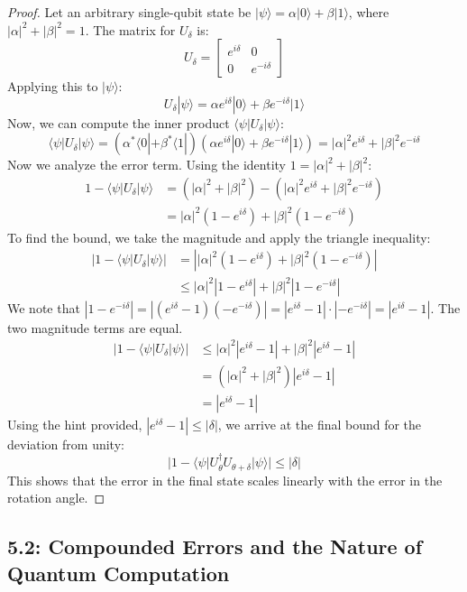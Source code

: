 \documentclass{article}
\newcommand{\ket}[1]{|#1\rangle}
\newcommand{\bra}[1]{\langle#1|}
\begin{document}
\begin{proof}
Let an arbitrary single-qubit state be $\ket{\psi} = \alpha\ket{0} + \beta\ket{1}$, where $|\alpha|^2 + |\beta|^2 = 1$. The matrix for $U_\delta$ is:
\[ U_\delta = \begin{bmatrix} e^{i\delta} & 0 \\ 0 & e^{-i\delta} \end{bmatrix} \]
Applying this to $\ket{\psi}$:
\[ U_\delta\ket{\psi} = \alpha e^{i\delta}\ket{0} + \beta e^{-i\delta}\ket{1} \]
Now, we can compute the inner product $\bra{\psi} U_\delta \ket{\psi}$:
\[ \bra{\psi} U_\delta \ket{\psi} = (\alpha^*\bra{0} + \beta^*\bra{1}) (\alpha e^{i\delta}\ket{0} + \beta e^{-i\delta}\ket{1}) = |\alpha|^2 e^{i\delta} + |\beta|^2 e^{-i\delta} \]
Now we analyze the error term. Using the identity $1 = |\alpha|^2 + |\beta|^2$:
\begin{align*}
    1 - \bra{\psi} U_\delta \ket{\psi} &= (|\alpha|^2 + |\beta|^2) - (|\alpha|^2 e^{i\delta} + |\beta|^2 e^{-i\delta}) \\
    &= |\alpha|^2(1 - e^{i\delta}) + |\beta|^2(1 - e^{-i\delta})
\end{align*}
To find the bound, we take the magnitude and apply the triangle inequality:
\begin{align*}
    |1 - \bra{\psi} U_\delta \ket{\psi}| &= \left| |\alpha|^2(1 - e^{i\delta}) + |\beta|^2(1 - e^{-i\delta}) \right| \\
    &\leq |\alpha|^2|1 - e^{i\delta}| + |\beta|^2|1 - e^{-i\delta}|
\end{align*}
We note that $|1 - e^{-i\delta}| = |(e^{i\delta} - 1)(-e^{-i\delta})| = |e^{i\delta}-1| \cdot |-e^{-i\delta}| = |e^{i\delta}-1|$. The two magnitude terms are equal.
\begin{align*}
    |1 - \bra{\psi} U_\delta \ket{\psi}| &\leq |\alpha|^2|e^{i\delta} - 1| + |\beta|^2|e^{i\delta} - 1| \\
    &= (|\alpha|^2 + |\beta|^2) |e^{i\delta} - 1| \\
    &= |e^{i\delta} - 1|
\end{align*}
Using the hint provided, $|e^{i\delta} - 1| \leq |\delta|$, we arrive at the final bound for the deviation from unity:
\[ |1 - \bra{\psi} U_{\theta}^\dagger U_{\theta+\delta} \ket{\psi}| \leq |\delta| \]
This shows that the error in the final state scales linearly with the error in the rotation angle.
\end{proof}

\subsection*{5.2: Compounded Errors and the Nature of Quantum Computation}
\end{document}
